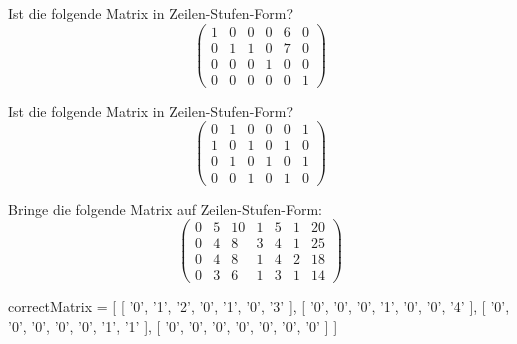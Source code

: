 \documentclass{ximera}
\begin{document}
\begin{question}
Ist die folgende Matrix in Zeilen-Stufen-Form?
\[
\left(
\begin{array}{cccccc}
1 & 0 & 0 & 0 & 6 & 0 \\
0 & 1 & 1 & 0 & 7 & 0 \\
0 & 0 & 0 & 1 & 0 & 0 \\
0 & 0 & 0 & 0 & 0 & 1 
\end{array}
\right)
\]
\begin{solution}
\begin{multiple-choice}
\end{multiple-choice}
\end{solution}
\end{question}


\begin{question}
Ist die folgende Matrix in Zeilen-Stufen-Form?
\[
\left(
\begin{array}{cccccc}
0 & 1 & 0 & 0 & 0 & 1 \\
1 & 0 & 1 & 0 & 1 & 0 \\
0 & 1 & 0 & 1 & 0 & 1 \\
0 & 0 & 1 & 0 & 1 & 0 
\end{array}
\right)
\]
\begin{solution}
\begin{multiple-choice}
\end{multiple-choice}
\end{solution}
\end{question}


\begin{question}
Bringe die folgende Matrix auf Zeilen-Stufen-Form:
\[
\left(
\begin{array}{ccccccc}
0 & 5 & 10& 1 & 5 & 1 & 20\\
0 & 4 & 8 & 3 & 4 & 1 & 25\\
0 & 4 & 8 & 1 & 4 & 2 & 18\\
0 & 3 & 6 & 1 & 3 & 1 & 14
\end{array}
\right)
\]
\begin{solution}
 \begin{matrix-answer}
correctMatrix = [ [ '0', '1',  '2', '0', '1', '0',  '3' ],
                  [ '0', '0',  '0', '1', '0', '0',  '4' ],
                  [ '0', '0',  '0', '0', '0', '1',  '1' ],
                  [ '0', '0',  '0', '0', '0', '0',  '0' ]
]
\end{matrix-answer}
\end{solution}
\end{question}
\end{document}
